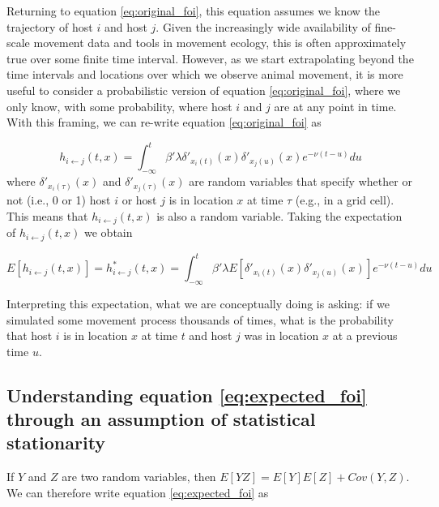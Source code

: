 \documentclass[letterpaper]{article}
\begin{document}
Returning to equation \ref{eq:original_foi}, this equation assumes we know the trajectory of host $i$ and host $j$.  Given the increasingly wide availability of fine-scale movement data and tools in movement ecology, this is often approximately true over some finite time interval. However, as we start extrapolating beyond the time intervals and locations over which we observe animal movement, it is more useful to consider a probabilistic version of equation \ref{eq:original_foi}, where we only know, with some probability, where host $i$ and $j$ are at any point in time. With this framing, we can re-write equation \ref{eq:original_foi} as

\begin{equation}
    h_{i \leftarrow j}(t, x) = \int_{-\infty}^{t} \beta' \lambda \delta'_{x_i(t)}(x) \delta'_{x_j(u)}(x) e^{-\nu(t - u)} du
    \label{eq:prob_foi}
\end{equation}
where $\delta'_{x_i(\tau)}(x)$ and $\delta'_{x_j(\tau)}(x)$ are random variables that specify whether or not (i.e., 0 or 1) host $i$ or host $j$ is in location $x$ at time $\tau$ (e.g., in a grid cell).  This means that $h_{i \leftarrow j}(t, x)$ is also a random variable. Taking the expectation of $h_{i \leftarrow j}(t, x)$ we obtain

\begin{equation}
    E[h_{i \leftarrow j}(t, x)] = h^*_{i \leftarrow j}(t, x) = \int_{-\infty}^{t} \beta' \lambda E[\delta'_{x_i(t)}(x) \delta'_{x_j(u)}(x)] e^{-\nu(t - u)} du
    \label{eq:expected_foi}
\end{equation}

Interpreting this expectation, what we are conceptually doing is asking: if we simulated some movement process thousands of times, what is the probability that host $i$ is in location $x$ at time $t$ and host $j$ was in location $x$ at a previous time $u$. 

\subsection*{Understanding equation \ref{eq:expected_foi} through an assumption of statistical stationarity}

If $Y$ and $Z$ are two random variables, then $E[YZ] = E[Y]E[Z] + Cov(Y, Z)$.  We can therefore write equation \ref{eq:expected_foi} as
\end{document}
